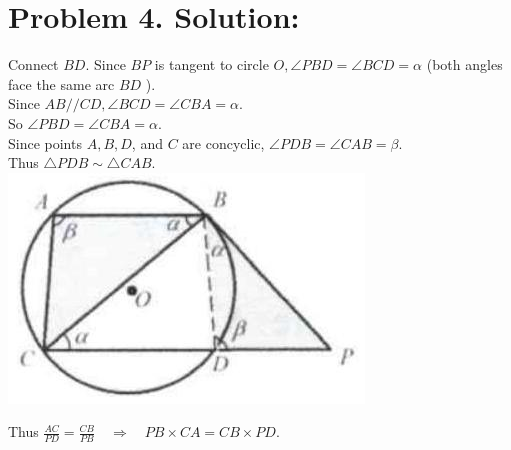 \documentclass[10pt]{article}
\begin{document}
\section*{Problem 4. Solution:}
Connect \(B D\). Since \(B P\) is tangent to circle \(O, \angle P B D=\angle B C D=\alpha\) (both angles face the same arc \(B D\) ).\\
Since \(A B / / C D, \angle B C D=\angle C B A=\alpha\).\\
So \(\angle P B D=\angle C B A=\alpha\).\\
Since points \(A, B, D\), and \(C\) are concyclic, \(\angle P D B=\angle C A B=\beta\).\\
Thus \(\triangle P D B \sim \triangle C A B\).\\
\includegraphics[max width=\textwidth, center]{2025_04_17_97bc1f7e44d93c271a88g-172}

Thus \(\frac{A C}{P D}=\frac{C B}{P B} \quad \Rightarrow \quad P B \times C A=C B \times P D\).
\end{document}
